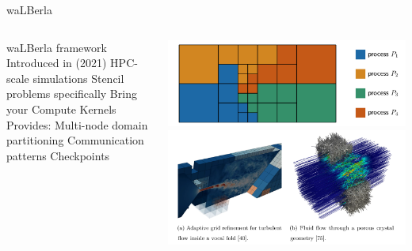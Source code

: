 \placelogofalse
\begin{frame}{waLBerla}
\begin{columns}
\begin{outline}
  \1 waLBerla framework 
  \2 Introduced in \cite{Bauer2021} (2021)
  \2 HPC-scale simulations
  \2 Stencil problems specifically
  \2 Bring your Compute Kernels
  \1 Provides:
  \2 Multi-node domain partitioning
  \2 Communication patterns 
  \2 Checkpoints
\end{outline}
\begin{center}
  \vspace{0.5cm}
  \includegraphics[width=0.8\linewidth]{walberla_partition.png}
  \vspace{0.5cm}
  \includegraphics[width=0.8\linewidth]{walberla_examples.png}
\end{center} 
\end{columns}
\end{frame}
\placelogotrue

